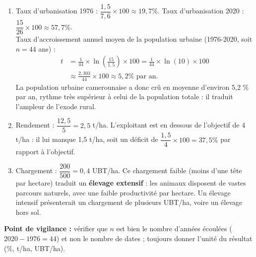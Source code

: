 \documentclass[11pt]{article}
\begin{document}
\begin{corrige}
\begin{enumerate}
\item Taux d'urbanisation 1976 : $\dfrac{1,5}{7,6} \times 100 \approx {19,7} \%$. Taux d'urbanisation 2020 : $\dfrac{15}{26} \times 100 \approx {57,7} \%$.\\
Taux d'accroissement annuel moyen de la population urbaine (1976-2020, soit $n = 44$ ans) :
\begin{align*}
t &= \frac{1}{44} \times \ln\left(\frac{15}{1,5}\right) \times 100 = \frac{1}{44} \times \ln(10) \times 100 \\
&\approx \frac{2,303}{44} \times 100 \approx {5,2} \% \text{ par an.}
\end{align*}
La population urbaine camerounaise a donc crû en moyenne d'environ 5,2 \% par an, rythme très supérieur à celui de la population totale : il traduit l'ampleur de l'exode rural.
\item Rendement : $\dfrac{12,5}{5} = {2,5}$ t/ha. L'exploitant est en dessous de l'objectif de 4 t/ha : il lui manque 1,5 t/ha, soit un déficit de $\dfrac{1,5}{4} \times 100 = {37,5} \%$ par rapport à l'objectif.
\item Chargement : $\dfrac{200}{500} = {0,4}$ UBT/ha. Ce chargement faible (moins d'une tête par hectare) traduit un \textbf{élevage extensif} : les animaux disposent de vastes parcours naturels, avec une faible productivité par hectare. Un élevage intensif présenterait un chargement de plusieurs UBT/ha, voire un élevage hors sol.
\end{enumerate}
\textbf{Point de vigilance :} vérifier que $n$ est bien le nombre d'années écoulées ($2020 - 1976 = 44$) et non le nombre de dates ; toujours donner l'unité du résultat (\%, t/ha, UBT/ha).
\end{corrige}
\end{document}
